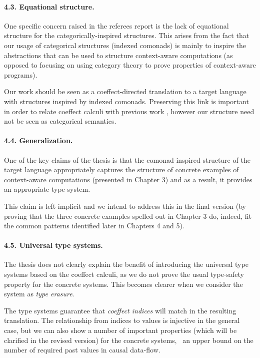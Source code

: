 \documentclass[
		twoside,openright,titlepage,numbers=noenddot,headinclude,%
                footinclude=true,cleardoublepage=empty,
                BCOR=10mm,paper=a4,fontsize=10pt, %
                ngerman,american, %
                ]{scrreprt}
\begin{document}
\vspace{-0.5em}
\paragraph{4.3. Equational structure.}

One specific concern raised in the referees report is the lack of equational structure for the
categorically-inspired structures. This arises from the fact that our usage of categorical
structures (indexed comonads) is mainly to inspire the abstractions that can be used to structure
context-aware computations (as opposed to focusing on using category theory to prove properties
of context-aware programs).

Our work should be seen as a coeffect-directed translation to a target language with structures
inspired by indexed comonads. Preserving this link is important in order to relate coeffect calculi with
previous work \cite{comonads-notions}, however our structure need not be seen as categorical
semantics.

\vspace{-0.5em}
\paragraph{4.4. Generalization.}

One of the key claims of the thesis is that the comonad-inspired structure of the target
language appropriately captures the structure of concrete examples of context-aware computations
(presented in Chapter 3) and as a result, it provides an appropriate type system.

This claim is left implicit and we intend to address this in the final version 
(by proving that the three concrete examples spelled out in Chapter 3 do, indeed, fit
the common patterns identified later in Chapters 4 and 5).

\vspace{-0.5em}
\paragraph{4.5. Universal type systems.}

The thesis does not clearly explain the benefit of introducing the universal type systems
based on the coeffect calculi, as we do not prove the usual type-safety property for the concrete systems.
This becomes clearer when we consider the system as \emph{type erasure}.

The type systems guarantee that \emph{coeffect indices} will match in the resulting 
translation. The relationship from indices to values is injective in the general case, but 
we can also show a number of important properties (which will be clarified in the revised
version) for the concrete systems, \eg~an upper bound on the number of required
past values in causal data-flow.
\end{document}
